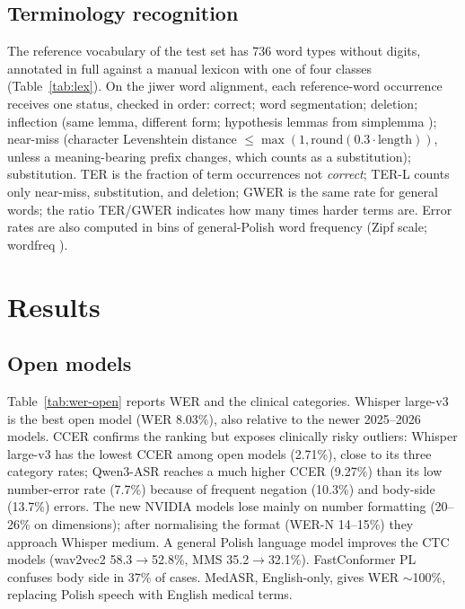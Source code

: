 \documentclass[conference]{IEEEtran}
\begin{document}
\subsection{Terminology recognition}
The reference vocabulary of the test set has 736 word types without digits, annotated in full against a manual lexicon with one of four classes (Table~\ref{tab:lex}). On the jiwer word alignment, each reference-word occurrence receives one status, checked in order: correct; word segmentation; deletion; inflection (same lemma, different form; hypothesis lemmas from simplemma \cite{r22}); near-miss (character Levenshtein distance $\le \max(1, \mathrm{round}(0.3\cdot\text{length}))$, unless a meaning-bearing prefix changes, which counts as a substitution); substitution. TER is the fraction of term occurrences not \emph{correct}; TER-L counts only near-miss, substitution, and deletion; GWER is the same rate for general words; the ratio TER/GWER indicates how many times harder terms are. Error rates are also computed in bins of general-Polish word frequency (Zipf scale; wordfreq \cite{r21,r24}).

\section{Results}
\subsection{Open models}
Table~\ref{tab:wer-open} reports WER and the clinical categories. Whisper large-v3 is the best open model (WER 8.03\%), also relative to the newer 2025--2026 models. CCER confirms the ranking but exposes clinically risky outliers: Whisper large-v3 has the lowest CCER among open models (2.71\%), close to its three category rates; Qwen3-ASR reaches a much higher CCER (9.27\%) than its low number-error rate (7.7\%) because of frequent negation (10.3\%) and body-side (13.7\%) errors. The new NVIDIA models lose mainly on number formatting (20--26\% on dimensions); after normalising the format (WER-N 14--15\%) they approach Whisper medium. A general Polish language model improves the CTC models (wav2vec2 58.3$\to$52.8\%, MMS 35.2$\to$32.1\%). FastConformer PL confuses body side in 37\% of cases. MedASR, English-only, gives WER $\sim$100\%, replacing Polish speech with English medical terms.
\end{document}
